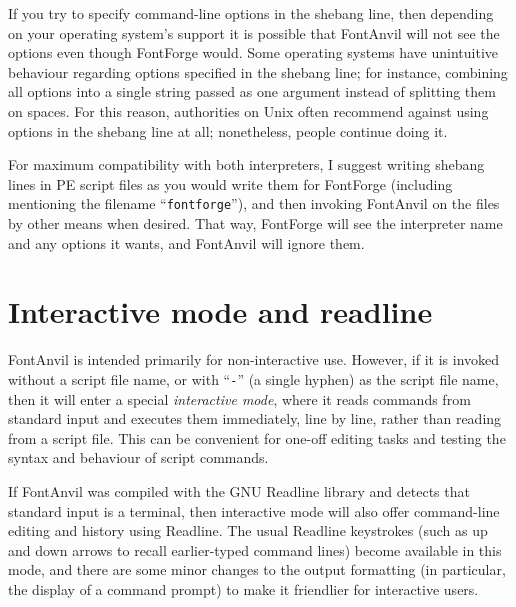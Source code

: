If you try to specify command-line options in the shebang line, then
depending on your operating system's support it is possible that FontAnvil
will not see the options even though FontForge would.  Some operating
systems have unintuitive behaviour regarding options specified in the
shebang line; for instance, combining all options into a single string
passed as one argument instead of splitting them on spaces.  For this
reason, authorities on Unix often recommend against using options in the
shebang line at all; nonetheless, people continue doing it.

For maximum compatibility with both interpreters, I suggest writing shebang
lines in PE script files as you would write them for FontForge (including
mentioning the filename ``\texttt{fontforge}''), and then invoking FontAnvil
on the files by other means when desired.  That way, FontForge will see the
interpreter name and any options it wants, and FontAnvil will ignore them.

\section{Interactive mode and readline}

FontAnvil is intended primarily for non-interactive use.  However, if it is
invoked without a script file name, or with ``\texttt{-}'' (a single hyphen)
as the script file name, then it will enter a special \emph{interactive
mode}, where it reads commands from standard input and executes them
immediately, line by line, rather than reading from a script file.  This can
be convenient for one-off editing tasks and testing the syntax and behaviour
of script commands.

If FontAnvil was compiled with the GNU Readline library and detects that
standard input is a terminal, then interactive mode will also offer
command-line editing and history using Readline.  The usual Readline
keystrokes (such as up and down arrows to recall earlier-typed command
lines) become available in this mode, and there are some minor changes to
the output formatting (in particular, the display of a command prompt) to
make it friendlier for interactive users.

